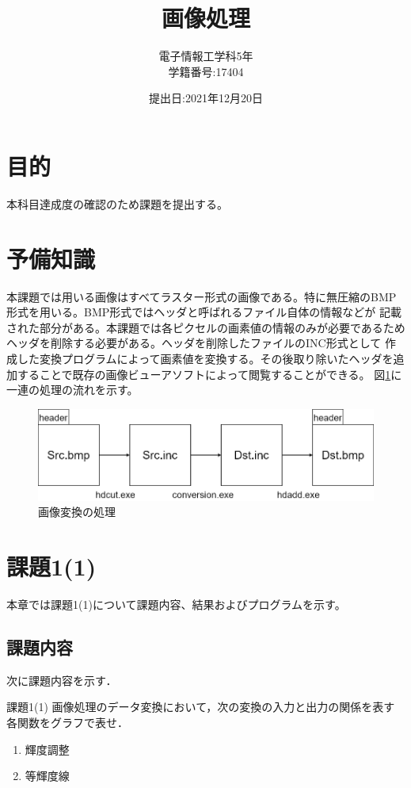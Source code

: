 \documentclass[11pt,a4paper,titlepage,dvipdfmx]{jarticle}
\title{\huge{画像処理}}
\author{電子情報工学科5年 \\学籍番号:17404}
\date{提出日:2021年12月20日}
\begin{document}
  \maketitle

  \section{目的}
    本科目達成度の確認のため課題を提出する。
  \section{予備知識}
    本課題では用いる画像はすべてラスター形式の画像である。特に無圧縮のBMP形式を用いる。BMP形式ではヘッダと呼ばれるファイル自体の情報などが
    記載された部分がある。本課題では各ピクセルの画素値の情報のみが必要であるためヘッダを削除する必要がある。ヘッダを削除したファイルのINC形式として
    作成した変換プログラムによって画素値を変換する。その後取り除いたヘッダを追加することで既存の画像ビューアソフトによって閲覧することができる。
    図\ref{fig:flow}に一連の処理の流れを示す。
    \begin{figure}[H]
      \centering
      \includegraphics[scale=.4]{./flow.png}
      \caption{画像変換の処理}
      \label{fig:flow}
    \end{figure}
  \section{課題1(1)}
    本章では課題1(1)について課題内容、結果およびプログラムを示す。
    \subsection{課題内容}
      次に課題内容を示す．
      \begin{itembox}[l]{課題1(1)}
        画像処理のデータ変換において，次の変換の入力と出力の関係を表す各関数をグラフで表せ．
        \begin{enumerate}
          \item 輝度調整
          \item 等輝度線
        \end{enumerate}
      \end{itembox}
\end{document}

